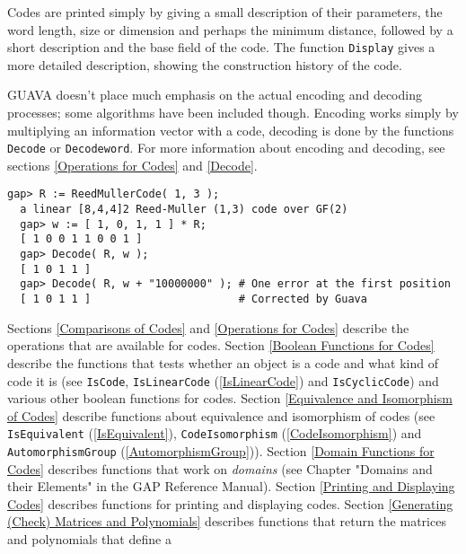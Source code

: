 \documentclass[11pt]{report}
\begin{document}
{ Codes are printed simply by giving a small description of their parameters,
the word length, size or dimension and perhaps the minimum distance, followed
by a short description and the base field of the code. The function \texttt{Display} gives a more detailed description, showing the construction history of the
code. 

 \textsf{GUAVA} doesn't place much emphasis on the actual encoding and decoding processes;
some algorithms have been included though. Encoding works simply by
multiplying an information vector with a code, decoding is done by the
functions \texttt{Decode} or \texttt{Decodeword}. For more information about encoding and decoding, see sections \ref{Operations for Codes} and \ref{Decode}. 
\begin{Verbatim}[fontsize=\small,frame=single,label=Example]
  gap> R := ReedMullerCode( 1, 3 );
  a linear [8,4,4]2 Reed-Muller (1,3) code over GF(2)
  gap> w := [ 1, 0, 1, 1 ] * R;
  [ 1 0 0 1 1 0 0 1 ]
  gap> Decode( R, w );
  [ 1 0 1 1 ]
  gap> Decode( R, w + "10000000" ); # One error at the first position
  [ 1 0 1 1 ]                       # Corrected by Guava 
\end{Verbatim}
  Sections \ref{Comparisons of Codes} and \ref{Operations for Codes} describe the operations that are available for codes. Section \ref{Boolean Functions for Codes} describe the functions that tests whether an object is a code and what kind of
code it is (see \texttt{IsCode}, \texttt{IsLinearCode} (\ref{IsLinearCode}) and \texttt{IsCyclicCode}) and various other boolean functions for codes. Section \ref{Equivalence and Isomorphism of Codes} describe functions about equivalence and isomorphism of codes (see \texttt{IsEquivalent} (\ref{IsEquivalent}), \texttt{CodeIsomorphism} (\ref{CodeIsomorphism}) and \texttt{AutomorphismGroup} (\ref{AutomorphismGroup})). Section \ref{Domain Functions for Codes} describes functions that work on \emph{domains} (see Chapter "Domains and their Elements" in the \textsf{GAP} Reference Manual). Section \ref{Printing and Displaying Codes} describes functions for printing and displaying codes. Section \ref{Generating (Check) Matrices and Polynomials} describes functions that return the matrices and polynomials that define a
}
\end{document}
